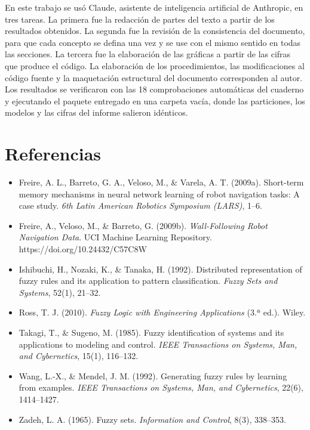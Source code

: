 \documentclass[11pt,letterpaper]{article}
\begin{document}
En este trabajo se usó Claude, asistente de inteligencia artificial de Anthropic, en tres tareas. La primera fue la redacción de partes del texto a partir de los resultados obtenidos. La segunda fue la revisión de la consistencia del documento, para que cada concepto se defina una vez y se use con el mismo sentido en todas las secciones. La tercera fue la elaboración de las gráficas a partir de las cifras que produce el código. La elaboración de los procedimientos, las modificaciones al código fuente y la maquetación estructural del documento corresponden al autor. Los resultados se verificaron con las 18 comprobaciones automáticas del cuaderno y ejecutando el paquete entregado en una carpeta vacía, donde las particiones, los modelos y las cifras del informe salieron idénticos.

\section{Referencias}
\begin{itemize}
    \item Freire, A. L., Barreto, G. A., Veloso, M., \& Varela, A. T. (2009a). Short-term memory mechanisms in neural network learning of robot navigation tasks: A case study. \textit{6th Latin American Robotics Symposium (LARS)}, 1--6.
    \item Freire, A., Veloso, M., \& Barreto, G. (2009b). \textit{Wall-Following Robot Navigation Data}. UCI Machine Learning Repository. https://doi.org/10.24432/C57C8W
    \item Ishibuchi, H., Nozaki, K., \& Tanaka, H. (1992). Distributed representation of fuzzy rules and its application to pattern classification. \textit{Fuzzy Sets and Systems}, 52(1), 21--32.
    \item Ross, T. J. (2010). \textit{Fuzzy Logic with Engineering Applications} (3.ª ed.). Wiley.
    \item Takagi, T., \& Sugeno, M. (1985). Fuzzy identification of systems and its applications to modeling and control. \textit{IEEE Transactions on Systems, Man, and Cybernetics}, 15(1), 116--132.
    \item Wang, L.-X., \& Mendel, J. M. (1992). Generating fuzzy rules by learning from examples. \textit{IEEE Transactions on Systems, Man, and Cybernetics}, 22(6), 1414--1427.
    \item Zadeh, L. A. (1965). Fuzzy sets. \textit{Information and Control}, 8(3), 338--353.
\end{itemize}
\end{document}
